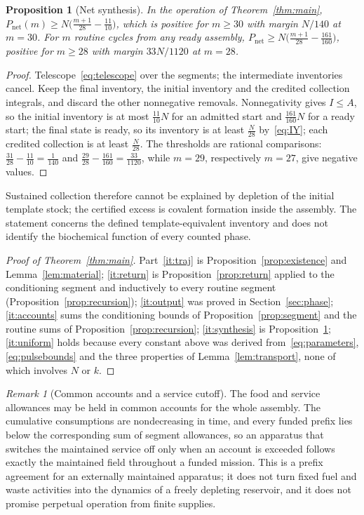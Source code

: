 \documentclass[11pt,a4paper]{article}
\theoremstyle{plain}
\newtheorem{proposition}[theorem]{Proposition}
\theoremstyle{definition}
\theoremstyle{remark}
\newtheorem{remark}[theorem]{Remark}
\newcommand{\Iv}{I}
\newcommand{\Pnet}{P_{\mathrm{net}}}
\begin{document}
\begin{proposition}[Net synthesis]\label{prop:synthesis}
In the operation of Theorem~\ref{thm:main}, $\Pnet(m)\ge N\bigl(\frac{m+1}{28}-\frac{11}{10}\bigr)$, which is positive for $m\ge30$ with margin $N/140$ at $m=30$. For $m$ routine cycles from any ready assembly, $\Pnet\ge N\bigl(\frac{m+1}{28}-\frac{161}{160}\bigr)$, positive for $m\ge28$ with margin $33N/1120$ at $m=28$.
\end{proposition}
\begin{proof}
Telescope~\eqref{eq:telescope} over the segments; the intermediate inventories cancel. Keep the final inventory, the initial inventory and the credited collection integrals, and discard the other nonnegative removals. Nonnegativity gives $\Iv\le A$, so the initial inventory is at most $\frac{11}{10}N$ for an admitted start and $\frac{161}{160}N$ for a ready start; the final state is ready, so its inventory is at least $\frac N{28}$ by~\eqref{eq:IY}; each credited collection is at least $\frac N{28}$. The thresholds are rational comparisons: $\frac{31}{28}-\frac{11}{10}=\frac1{140}$ and $\frac{29}{28}-\frac{161}{160}=\frac{33}{1120}$, while $m=29$, respectively $m=27$, give negative values.
\end{proof}
Sustained collection therefore cannot be explained by depletion of the initial template stock; the certified excess is covalent formation inside the assembly. The statement concerns the defined template-equivalent inventory and does not identify the biochemical function of every counted phase.

\begin{proof}[Proof of Theorem~\ref{thm:main}]
Part~\ref{it:traj} is Proposition~\ref{prop:existence} and Lemma~\ref{lem:material}; \ref{it:return} is Proposition~\ref{prop:return} applied to the conditioning segment and inductively to every routine segment (Proposition~\ref{prop:recursion}); \ref{it:output} was proved in Section~\ref{sec:phase}; \ref{it:accounts} sums the conditioning bounds of Proposition~\ref{prop:segment} and the routine sums of Proposition~\ref{prop:recursion}; \ref{it:synthesis} is Proposition~\ref{prop:synthesis}; \ref{it:uniform} holds because every constant above was derived from~\eqref{eq:parameters}, \eqref{eq:pulsebounds} and the three properties of Lemma~\ref{lem:transport}, none of which involves $N$ or $k$.
\end{proof}

\begin{remark}[Common accounts and a service cutoff]\label{rem:cutoff}
The food and service allowances may be held in common accounts for the whole assembly. The cumulative consumptions are nondecreasing in time, and every funded prefix lies below the corresponding sum of segment allowances, so an apparatus that switches the maintained service off only when an account is exceeded follows exactly the maintained field throughout a funded mission. This is a prefix agreement for an externally maintained apparatus; it does not turn fixed fuel and waste activities into the dynamics of a freely depleting reservoir, and it does not promise perpetual operation from finite supplies.
\end{remark}
\end{document}
